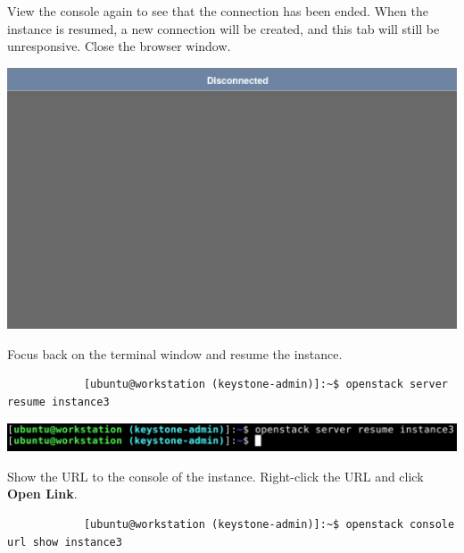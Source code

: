 \documentclass[letterpaper, 12pt]{article}
\begin{document}
\begin{enumerate}
    \begin{labstep}
        View the console again to see that the connection has been ended.
        When the instance is resumed, a new connection will be created, and this tab will still be unresponsive.
        Close the browser window.

        \begin{center}
            \includegraphics[width=\linewidth]{images/part4/step11.png}
        \end{center}
    \end{labstep}

    \begin{labstep}
        Focus back on the terminal window and resume the instance.
        \begin{lstlisting}
            [ubuntu@workstation (keystone-admin)]:~$ openstack server resume instance3
        \end{lstlisting}

        \begin{center}
            \includegraphics[width=\linewidth]{images/part4/step12.png}
        \end{center}
    \end{labstep}

    \begin{labstep}
        Show the URL to the console of the instance.
        Right-click the URL and click \textbf{Open Link}.
        \begin{lstlisting}
            [ubuntu@workstation (keystone-admin)]:~$ openstack console url show instance3
        \end{lstlisting}


\end{labstep}
\end{enumerate}
\end{document}
